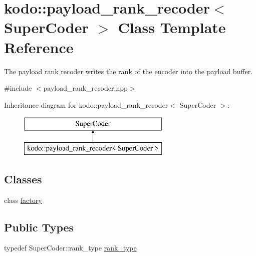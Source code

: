 \hypertarget{classkodo_1_1payload__rank__recoder}{\section{kodo\-:\-:payload\-\_\-rank\-\_\-recoder$<$ Super\-Coder $>$ Class Template Reference}
\label{classkodo_1_1payload__rank__recoder}
}


The payload rank recoder writes the rank of the encoder into the payload buffer.  




{\ttfamily \#include $<$payload\-\_\-rank\-\_\-recoder.\-hpp$>$}

Inheritance diagram for kodo\-:\-:payload\-\_\-rank\-\_\-recoder$<$ Super\-Coder $>$\-:\begin{figure}[H]
\begin{center}
\leavevmode
\includegraphics[height=2.000000cm]{classkodo_1_1payload__rank__recoder}
\end{center}
\end{figure}
\subsection*{Classes}
\begin{DoxyCompactItemize}
\item 
class \hyperlink{classkodo_1_1payload__rank__recoder_1_1factory}{factory}
\end{DoxyCompactItemize}
\subsection*{Public Types}
\begin{DoxyCompactItemize}
\item 
typedef Super\-Coder\-::rank\-\_\-type \hyperlink{classkodo_1_1payload__rank__recoder_a386c05a2c9fcfd5d913b97867e1f1944}{rank\-\_\-type}
\begin{DoxyCompactList}\small\item\em \end{DoxyCompactList}\end{DoxyCompactItemize}
